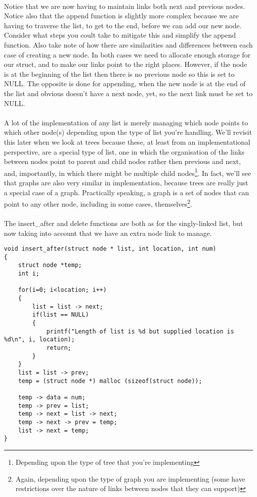 \documentclass[10pt, a4paper, twosize]{article}
\begin{document}
\paragraph{} Notice that we are now having to maintain links both next and previous nodes. Notice also that the append function is slightly more complex because we are having to traverse the list, to get to the end, before we can add our new node. Consider what steps you coult take to mitigate this and simplify the append function. Also take note of how there are similarities and differences between each case of creating a new node. In both cases we need to allocate enough storage for our struct, and to make our links point to the right places. However, if the node is at the beginning of the list then there is no previous node so this is set to NULL. The opposite is done for appending, when the new node is at the end of the list and obvious doesn't have a next node, yet, so the next link must be set to NULL.

\paragraph{} A lot of the implementation of any list is merely managing which node points to which other node(s) depending upon the type of list you're handling. We'll revisit this later when we look at trees because these, at least from an implementational perspective, are a special type of list, one in which the organisation of the links between nodes point to parent and child nodes rather then previous and next, and, importantly, in which there might be multiple child nodes\footnote{Depending upon the type of tree that you're implementing}. In fact, we'll see that graphs are also very similar in implementation, because trees are really just a special case of a graph. Practically speaking, a graph is a set of nodes that can point to any other node, including in some cases, themselves\footnote{Again, depending upon the type of graph you are implementing (some have restrictions over the nature of links between nodes that they can support)}.

\paragraph{} The insert\_after and delete functions are both as for the singly-linked list, but now taking into account that we have an extra node link to manage.
\begin{lstlisting}
void insert_after(struct node * list, int location, int num)
{
    struct node *temp;
    int i;
    
    for(i=0; i<location; i++)
    {
        list = list -> next;
        if(list == NULL)
        {
            printf("Length of list is %d but supplied location is %d\n", i, location);
            return;
        }
    }
    list = list -> prev;
    temp = (struct node *) malloc (sizeof(struct node));

    temp -> data = num;
    temp -> prev = list;
    temp -> next = list -> next;
    temp -> next -> prev = temp;
    list -> next = temp;
}
\end{lstlisting}
\end{document}
